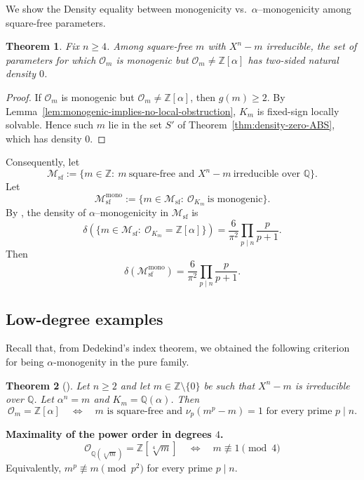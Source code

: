 \documentclass[11pt,letterpaper]{amsart}
\newcommand{\Z}{\mathbb{Z}}
\newcommand{\Q}{\mathbb{Q}}
\newcommand{\Ocal}{\mathcal{O}}
\newcommand{\vvp}{\nu} %
\theoremstyle{plain}
\newtheorem{theorem}{Theorem}[section]
\theoremstyle{definition}
\theoremstyle{remark}
\theoremstyle{plain}
\begin{document}
We show the Density equality between monogenicity vs.\ $\alpha$--monogenicity among square-free parameters.
\begin{theorem}
\label{thm:density-equality}
Fix $n\ge 4$. Among square-free $m$ with $X^n-m$ irreducible, the set of parameters for which $\Ocal_m$ is monogenic
but $\Ocal_m\neq\Z[\alpha]$ has two-sided natural density $0$.
\end{theorem}

\begin{proof}
If $\Ocal_m$ is monogenic but $\Ocal_m\neq\Z[\alpha]$, then $g(m)\ge 2$.
By Lemma~\ref{lem:monogenic-implies-no-local-obstruction}, $K_m$ is fixed-sign locally solvable.
Hence such $m$ lie in the set $S'$ of Theorem~\ref{thm:density-zero-ABS}, which has density $0$.
\end{proof}

Consequently, let
\[
\mathcal{M}_{\mathrm{sf}}:=\{m\in\Z:\ m\ \text{square-free and }X^n-m\ \text{irreducible over }\Q\}.
\]
Let
\[
\mathcal{M}_{\mathrm{sf}}^{\mathrm{mono}}:=\{m\in\mathcal{M}_{\mathrm{sf}}:\ \Ocal_{K_m}\ \text{is monogenic}\}.
\]
By \cite{NDN25}, the density of $\alpha$--monogenicity in $\mathcal{M}_{\mathrm{sf}}$ is
\[
\delta\!\left(\{m\in\mathcal{M}_{\mathrm{sf}}:\ \Ocal_{K_m}=\Z[\alpha]\}\right)
=\frac{6}{\pi^2}\prod_{p\mid n}\frac{p}{p+1}.
\]
Then
\[
\delta\!\left(\mathcal{M}_{\mathrm{sf}}^{\mathrm{mono}}\right)
=\frac{6}{\pi^2}\prod_{p\mid n}\frac{p}{p+1}.
\]


\subsection{Low-degree examples}
\label{subsec:explicit-examples}

Recall that, from Dedekind's index theorem, we obtained the following criterion for being $\alpha$-monogenity in the pure family.

\begin{theorem}[{\cite[Theorem~2.4]{NDN25}}]
\label{thm:alpha-criterion}
Let $n\ge 2$ and let $m\in\Z\setminus\{0\}$ be such that $X^n-m$ is irreducible over $\Q$.
Let $\alpha^n=m$ and $K_m=\Q(\alpha)$.
Then
\[
\Ocal_m=\Z[\alpha]
\quad\Longleftrightarrow\quad
\text{$m$ is square-free and $\vvp_p(m^p-m)=1$ for every prime $p\mid n$.}
\]
\end{theorem}

\noindent\textbf{Maximality of the power order in degrees $4$.}
\begin{equation}\label{eq:alpha-mono-small-n}
\Ocal_{\Q(\sqrt[4]{m})}=\Z[\sqrt[4]{m}]
\quad\Longleftrightarrow\quad m\not\equiv 1\pmod 4
\end{equation}
Equivalently, $m^p\not\equiv m\pmod{p^2}$ for every prime $p\mid n$.
\end{document}
